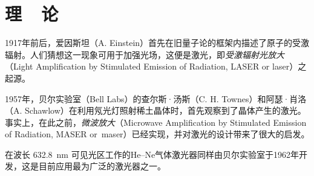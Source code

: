 \documentclass{buaaemp}
\begin{document}



\wuhao 

\section{理~~论}
	1917年前后，爱因斯坦（A. Einstein）首先在旧量子论的框架内描述了原子的受激辐射\cite{einstein1917quantentheorie}。人们猜想这一现象可用于加强光场，这便是激光，即\textit{受激辐射光放大}（Light Amplification by
	Stimulated Emission of Radiation, LASER or laser）之起源。
	
	1957年，贝尔实验室（Bell Labs）的查尔斯·汤斯（C. H. Townes）和阿瑟·肖洛（A. Schawlow）在利用氖光灯照射稀土晶体时，首先观察到了晶体产生的激光\cite{schawlow1958infrared}。事实上，在此之前，\textit{微波放大}（Microwave Amplification by Stimulated Emission of Radiation, MASER or~maser）已经实现，并对激光的设计带来了很大的启发\cite{townes1999laser}。
	
	在波长 \SI{632.8}{\nm} 可见光区工作的He--Ne气体激光器同样由贝尔实验室于1962年开发，这是目前应用最为广泛的激光器之一\cite{white1962continuous}。
 
\end{document}

